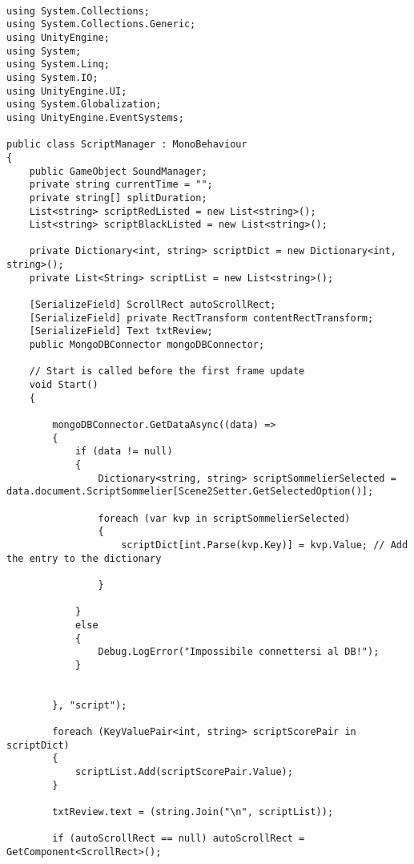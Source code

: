 \begin{lstlisting}[caption=Codice sorgente dello script \textit{ScriptManager}, label=lst:ScriptManagerScript, captionpos=b, basicstyle=\scriptsize]

using System.Collections;
using System.Collections.Generic;
using UnityEngine;
using System;
using System.Linq;
using System.IO;
using UnityEngine.UI;
using System.Globalization;
using UnityEngine.EventSystems;

public class ScriptManager : MonoBehaviour
{
    public GameObject SoundManager;
    private string currentTime = "";
    private string[] splitDuration;
    List<string> scriptRedListed = new List<string>();
    List<string> scriptBlackListed = new List<string>();
    
    private Dictionary<int, string> scriptDict = new Dictionary<int, string>();
    private List<String> scriptList = new List<string>();

    [SerializeField] ScrollRect autoScrollRect;
    [SerializeField] private RectTransform contentRectTransform;
    [SerializeField] Text txtReview;
    public MongoDBConnector mongoDBConnector;
    
    // Start is called before the first frame update
    void Start()
    {
        
        mongoDBConnector.GetDataAsync((data) =>
        {
            if (data != null)
            {
                Dictionary<string, string> scriptSommelierSelected = data.document.ScriptSommelier[Scene2Setter.GetSelectedOption()];
                
                foreach (var kvp in scriptSommelierSelected)
                {
                    scriptDict[int.Parse(kvp.Key)] = kvp.Value; // Add the entry to the dictionary
                    
                }
                
            }
            else
            {
                Debug.LogError("Impossibile connettersi al DB!");
            }

            
        }, "script");
        
        foreach (KeyValuePair<int, string> scriptScorePair in scriptDict)
        {
            scriptList.Add(scriptScorePair.Value);
        }
        
        txtReview.text = (string.Join("\n", scriptList));

        if (autoScrollRect == null) autoScrollRect = GetComponent<ScrollRect>();


\end{lstlisting}
